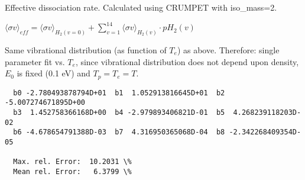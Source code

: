 \documentclass[12pt,dvipdfmx]{article}
\begin{document}
  Effective dissociation rate. Calculated using CRUMPET with iso_mass=2.

  $ \langle\sigma v \rangle_{eff} = \langle\sigma v \rangle_{H_2(v=0)} + \sum_{v=1}^{14}
\langle\sigma v \rangle_{H_2(v)} \cdot pH_2(v) $

  Same vibrational distribution (as function of $T_e$) as above.
  Therefore:
  single parameter fit vs. $T_e$,
  since vibrational distribution does not depend upon density, $E_0$ is fixed
  (0.1 eV) and $T_p = T_e = T$.

\begin{small}\begin{verbatim}
  b0 -2.780493878794D+01  b1  1.052913816645D+01  b2 -5.007274671895D+00
  b3  1.452758366168D+00  b4 -2.979893406821D-01  b5  4.268239118203D-02
  b6 -4.678654791388D-03  b7  4.316950365068D-04  b8 -2.342268409354D-05

  Max. rel. Error:  10.2031 \%
  Mean rel. Error:   6.3799 \%

\end{verbatim}\end{small}
\newpage
\end{document}
